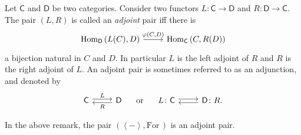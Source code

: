 \begin{defn}
	Let $\mathsf{C}$ and $\mathsf{D}$ be two categories.
	Consider two functors $L\colon \mathsf{C} \to \mathsf{D}$ and $R\colon \mathsf{D} \to \mathsf{C}$.
	The pair $\left(L, R\right)$ is called an {\em adjoint} pair iff there is
	\begin{equation}
	\begin{tikzcd}
		\mathrm{Hom}_{\mathsf{D}} \left( L(C), D \right) \arrow[r, "{\varphi(C,D)}", rightarrow] &
		\mathrm{Hom}_{\mathsf{C}} \left( C, R(D) \right)
	\end{tikzcd}
	\end{equation} 
	a bijection natural in $C$ and $D$.
	In particular $L$ is the left adjoint of $R$ and $R$ is the right adjoint of $L$.
	An adjoint pair is sometimes referred to as an adjunction, and denoted by
	\begin{equation}
	\begin{tikzcd}
		\mathsf{C} \arrow[r, "L", rightarrow, shift left = .5ex] &
		\mathsf{D} \arrow[l, "R", rightarrow, shift left = .5ex] 
	\end{tikzcd}
	\quad\text{ or }\quad
	\begin{tikzcd}
		L\colon\mathsf{C} \arrow[r, "", rightarrow, shift left = .5ex] &
		\mathsf{D}\colon R \arrow[l, "", rightarrow, shift left = .5ex] 
	.\end{tikzcd}
	\end{equation} 
\end{defn}

\begin{rem}
	In the above remark, the pair $\left(\left\langle - \right\rangle, \mathrm{For}\, \right)$ is an adjoint pair.
\end{rem} 

